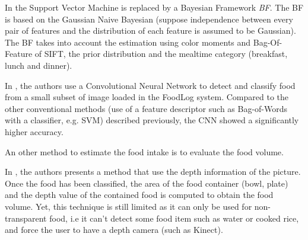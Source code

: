 In \cite{Aizawa2013} the Support Vector Machine is replaced by a Bayesian Framework \textit{BF}.
The BF is based on the Gaussian Naive Bayesian (suppose independence between every pair of features and the distribution of each feature is assumed to be Gaussian). The BF takes into account the estimation using color moments and Bag-Of-Feature of SIFT, the prior distribution and the mealtime category (breakfast, lunch and dinner).

In \cite{Kagaya2014}, the authors use a Convolutional Neural Network  to detect and classify food from a small subset of image loaded in the FoodLog system. Compared to the other conventional methods (use of a feature descriptor such as Bag-of-Words with a classifier, e.g. SVM) described previously, the CNN showed a significantly higher accuracy.


An other method to estimate the food intake is to evaluate the food volume.

In \cite{Chen2012}, the authors presents a method that use the depth information of the picture. Once the food has been classified, the area of the food container (bowl, plate) and the depth value of the contained food is computed to obtain the food volume.
Yet, this technique is still limited as it can only be used for non-transparent food, i.e it can't detect some food item such as water or cooked rice, and force the user to have a depth camera (such as Kinect).

